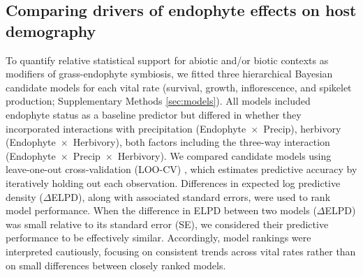 \documentclass[12pt]{article}\usepackage[]{graphicx}\usepackage[dvipsnames]{xcolor}
\newcommand{\tom}[2]{{\color{red}{#1}}\footnote{\textit{\color{red}{#2}}}}
\begin{document}
\subsection*{Comparing drivers of endophyte effects on host demography}
To quantify relative statistical support for abiotic and/or biotic contexts as modifiers of grass-endophyte symbiosis, we fitted three hierarchical Bayesian candidate models for each vital rate (survival, growth, inflorescence, and spikelet production; Supplementary Methods \ref{sec:models}).
All models included endophyte status as a baseline predictor but differed in whether they incorporated interactions with precipitation (Endophyte~$\times$~Precip), herbivory (Endophyte~$\times$~Herbivory), both factors including the three-way interaction (Endophyte~$\times$~Precip~$\times$~Herbivory).
We compared candidate models using leave-one-out cross-validation (LOO-CV) \citep{vehtari2017practical}, which estimates predictive accuracy by iteratively holding out each observation. 
Differences in expected log predictive density ($\Delta$ELPD), along with associated standard errors, were used to rank model performance.
When the difference in ELPD between two models ($\Delta$ELPD) was small relative to its standard error (SE), we considered their predictive performance to be effectively similar. 
Accordingly, model rankings were interpreted cautiously, focusing on consistent trends across vital rates rather than on small differences between closely ranked models.
\end{document}
